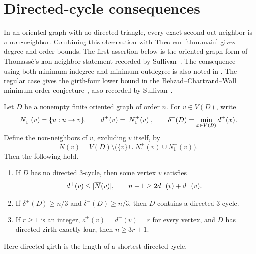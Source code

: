 \section{Directed-cycle consequences}\label{sec:directed-cycle-consequences}

In an oriented graph with no directed triangle, every exact second
out-neighbor is a non-neighbor.  Combining this observation with
Theorem~\ref{thm:main} gives degree and order bounds.
The first assertion below is the oriented-graph form of Thomass\'e's
non-neighbor statement recorded by
Sullivan~\cite[Conjecture~6.12]{Sullivan2006}.
The consequence using both minimum indegree and minimum outdegree is also
noted in \cite[Section~3]{Sullivan2006}.  The regular case gives the
girth-four lower bound in the Behzad--Chartrand--Wall minimum-order
conjecture~\cite{BehzadChartrandWall1970}, also recorded by
Sullivan~\cite[Section~4]{Sullivan2006}.

\begin{corollary}\label{cor:directed-cycle-consequences}
Let \(D\) be a nonempty finite oriented graph of order \(n\).  For
\(v\in V(D)\), write
\[
 N_1^-(v)=\{u:u\to v\},\qquad
 d^\pm(v)=\lvert N_1^\pm(v)\rvert,\qquad
 \delta^\pm(D)=\min_{x\in V(D)}d^\pm(x).
\]
Define the non-neighbors of \(v\), excluding \(v\) itself, by
\[
 \overline N(v)=V(D)\setminus
 \bigl(\{v\}\cup N_1^+(v)\cup N_1^-(v)\bigr).
\]
Then the following hold.
\begin{enumerate}[label=\textup{(\roman*)}]
\item If \(D\) has no directed \(3\)-cycle, then some vertex \(v\) satisfies
\[
 d^+(v)\leq\lvert \overline N(v)\rvert,\qquad
 n-1\geq 2d^+(v)+d^-(v).
\]
\item If \(\delta^+(D)\geq n/3\) and \(\delta^-(D)\geq n/3\), then \(D\)
contains a directed \(3\)-cycle.
\item If \(r\geq1\) is an integer, \(d^+(v)=d^-(v)=r\) for every vertex,
and \(D\) has directed girth exactly four, then \(n\geq3r+1\).
\end{enumerate}
Here directed girth is the length of a shortest directed cycle.
\end{corollary}

